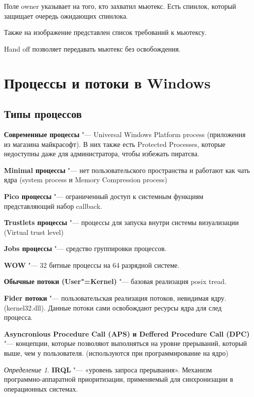 \documentclass[bachelor, och, book]{SCWorks}
\theoremstyle{remark}
\newtheorem{definition}{Определение}
\begin{document}
    Поле owner указывает на того, кто захватил мьютекс. Есть спинлок, который защищает очередь ожидающих спинлока.

    Также на изображение представлен список требований к мьютексу.

    Hand off позволяет передавать мьютекс без освобождения.


    \section{Процессы и потоки в Windows}

    \subsection{Типы процессов}

    \textbf{Современные процессы} "--- Universal Windows Platform process (приложения из магазина майкрасофт). В них также есть Protected Processes, которые недоступны даже для администратора, чтобы избежать пиратсва.

    \textbf{Minimal процессы} "--- нет пользовательского пространства и работают как чать ядра (system process и Memory Compression process)
    
    \textbf{Pico процессы} "--- ограниченный доступ к системным функциям представляющий набор callback.

    \textbf{Trustlets процессы} "--- процессы для запуска внутри системы визуализации (Virtual trust level)

    \textbf{Jobs процессы} "--- средство группировки процессов.

    \textbf{WOW} "--- 32 битные процессы на 64 разрядной системе.

    \textbf{Обычные потоки (User"=Kernel)} "--- базовая реализация posix tread.

    \textbf{Fider потоки} "--- пользовательская реализация потоков, невидимая ядру. (kernel32.dll). Данные потоки сами освобождают ресурсы ядра для след процесса.

    \textbf{Asyncronious Procedure Call (APS) и Deffered Procedure Call (DPC)} "--- концепции, которые позволяют выполняться на уровне прерываний, который выше, чем у пользователя. (используются при программирование на ядро)

    \begin{definition}
        \textbf{IRQL} "--- «уровень запроса прерывания». Механизм программно-аппаратной приоритизации, применяемый для синхронизации в операционных системах.
    \end{definition}
\end{document}
